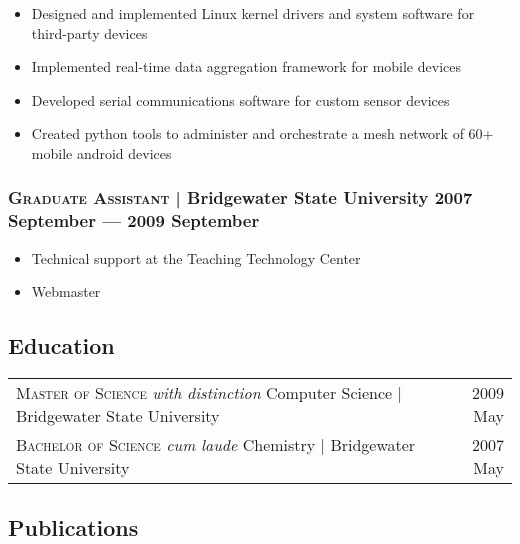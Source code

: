 \documentclass[letterpaper,10pt]{article}
\begin{document}
\begin{itemize}

\item
  Designed and implemented Linux kernel drivers and system software for
  third-party devices
\item
  Implemented real-time data aggregation framework for mobile devices
\item
  Developed serial communications software for custom sensor devices
\item
  Created python tools to administer and orchestrate a mesh network of 60+
  mobile android devices

\end{itemize}


\subsubsection*{\textsc{Graduate Assistant} | Bridgewater State University \hfill 2007 September --- 2009 September}

\begin{itemize}
\item Technical support at the Teaching Technology Center
\item Webmaster
\end{itemize}


\subsection*{Education}

\begin{tabular*}{\linewidth}{@{\extracolsep{\fill}} lr }
  \textsc{Master of Science} \textit{with distinction} Computer Science | Bridgewater State University & 2009 May \\
  \textsc{Bachelor of Science} \textit{cum laude} Chemistry | Bridgewater State University & 2007 May \\
\end{tabular*}


\subsection*{Publications}
\end{document}
